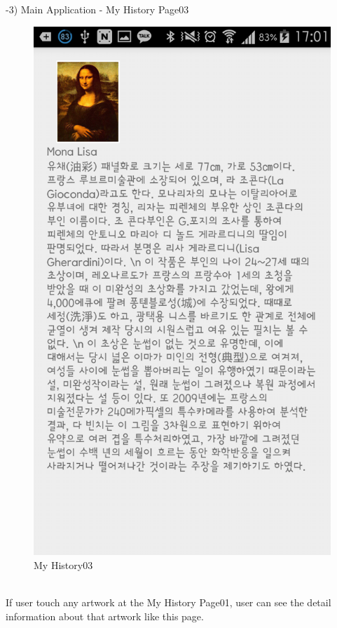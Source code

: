 \documentclass[conference]{IEEEtran}
\begin{document}
-3) Main Application - My History Page03\\
\begin{figure}[htbp]
\begin{center}
    \includegraphics[scale=0.2]{img_capture06}
    \caption{My History03} 
\end{center}
\end{figure}\\
\quad If user touch any artwork at the My History Page01, user can see the detail information about that artwork like this page.\\\\\\\\
\end{document}
